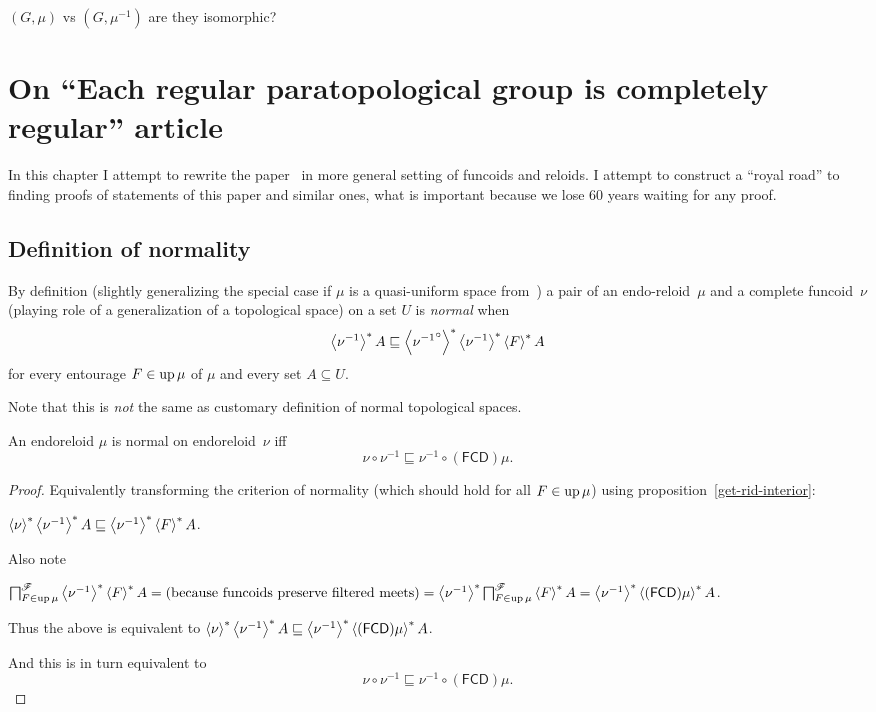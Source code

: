 $(G, \mu)$ vs $(G, \mu^{-1})$ are they isomorphic?


\section{On ``Each regular paratopological group is completely regular'' article}

In this chapter I attempt to rewrite the paper~\cite{2014arXiv1410.1504B} in more general setting of funcoids and reloids.
I attempt to construct a ``royal road'' to finding proofs of statements of this paper and similar ones, what is
important because we lose 60 years waiting for any proof.

\subsection{Definition of normality}

By definition (slightly generalizing the special case if $\mu$ is a
quasi-uniform space from~\cite{2014arXiv1410.1504B})
a pair of an endo-reloid~$\mu$ and a complete funcoid~$\nu$ (playing role of a generalization of a topological space)
on a set $U$ is \emph{normal} when
\[ \left\langle \nu^{-1}\right\rangle ^{\ast} A \sqsubseteq \left\langle 
{\nu^{-1}}^{\circ}\right\rangle ^{\ast} \left\langle \nu^{-1}\right\rangle ^{\ast} \left\langle F\right\rangle ^{\ast} A \] for every entourage $F \in
\operatorname{up} \mu$ of $\mu$ and every set $A \subseteq U$.

Note that this is \emph{not} the same as customary definition of normal topological spaces.

\begin{thm}
  An endoreloid $\mu$ is normal on endoreloid~$\nu$ iff
  \[ \nu \circ \nu^{-1} \sqsubseteq
  \nu^{-1} \circ (\mathsf{FCD}) \mu. \]
\end{thm}

\begin{proof}
  Equivalently transforming the criterion of normality (which should hold for
  all $F \in \operatorname{up} \mu$) using proposition~\ref{get-rid-interior}:

  $\left\langle \nu\right\rangle ^{\ast}
  \left\langle \nu^{-1}\right\rangle ^{\ast} A \sqsubseteq
  \left\langle \nu^{-1}\right\rangle ^{\ast} \left\langle F\right\rangle ^{\ast} A$.

  Also note
  
  $\bigsqcap^{\mathscr{F}}_{F \in \operatorname{up} \mu} \left\langle  \nu^{-1}
  \right\rangle ^{\ast} \left\langle F\right\rangle ^{\ast} A = \text{(because funcoids preserve
  filtered meets)} = \left\langle  \nu^{-1}
  \right\rangle ^{\ast}  \bigsqcap^{\mathscr{F}}_{F \in \operatorname{up} \mu} \left\langle F\right\rangle ^{\ast} A =
  \left\langle  \nu^{-1} \right\rangle ^{\ast}
  \left\langle  (\mathsf{FCD}) \mu \right\rangle ^{\ast} A$.

  Thus the above is equivalent to
  $\left\langle \nu\right\rangle ^{\ast}
  \left\langle \nu^{-1}\right\rangle ^{\ast} A \sqsubseteq
  \left\langle  \nu^{-1} \right\rangle ^{\ast}
  \left\langle  (\mathsf{FCD}) \mu \right\rangle ^{\ast} A$.

  And this is in turn equivalent to
  \[ \nu \circ \nu^{-1} \sqsubseteq
  \nu^{-1} \circ (\mathsf{FCD}) \mu. \]
\end{proof}

